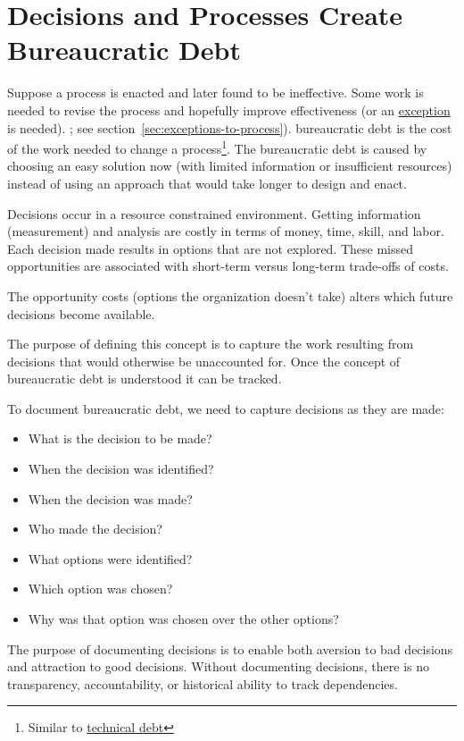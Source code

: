 \section{Decisions and Processes Create Bureaucratic Debt\label{sec:bureaucratic-debt}}


Suppose a \gls{process} is enacted and later found to be ineffective. Some work is needed to revise the process and hopefully improve effectiveness (or an \hyperref[sec:exceptions-to-process]{exception} is needed).
\ifsectionref
; see section~\ref{sec:exceptions-to-process}).
\fi
\gls{bureaucratic debt} is the cost of the work needed to change a process\footnote{Similar to \href{https://en.wikipedia.org/wiki/Technical_debt}{technical debt}}. The bureaucratic debt is caused by choosing an easy solution now (with limited information or insufficient resources) instead of using an approach that would take longer to design and enact.


Decisions occur in a resource constrained environment.
Getting information (measurement) and analysis are costly in terms of money, time, skill, and labor.
Each decision made results in options that are not explored. These missed opportunities are associated with short-term versus long-term trade-offs of costs.

The opportunity costs (options the organization doesn't take) alters which future decisions become available.

The purpose of defining this concept is to capture the work resulting from decisions that would otherwise be unaccounted for.
Once the concept of bureaucratic debt is understood it can be tracked.

To document bureaucratic debt, we need to capture decisions as they are made:
\begin{itemize}
    \item What is the decision to be made?
    \item When the decision was identified?
    \item When the decision was made?
    \item Who made the decision?
    \item What options were identified?
    \item Which option was chosen?
    \item Why was that option was chosen over the other options?
\end{itemize}
The purpose of documenting decisions is to enable both aversion to bad decisions and attraction to good decisions. Without documenting decisions, there is no transparency, accountability, or historical ability to track dependencies. 

